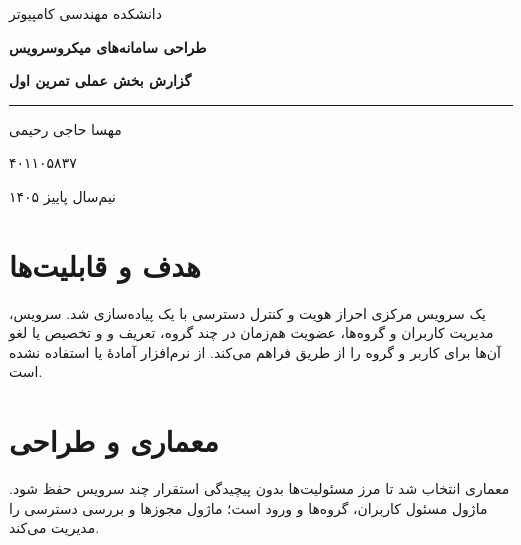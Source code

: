 \documentclass[12pt,a4paper]{article}
\newcommand{\StudentName}{مهسا حاجی رحیمی}
\newcommand{\StudentID}{۴۰۱۱۰۵۸۳۷}
\begin{document}
\begin{titlepage}
\thispagestyle{empty}
\vspace*{2.75cm}
\begin{center}
{\color{slate}\fontsize{16}{26}\selectfont دانشکده مهندسی کامپیوتر\par}
\vspace{1.25cm}
{\color{navy}\bfseries\fontsize{27}{42}\selectfont طراحی سامانه‌های میکروسرویس\par}
\vspace{1.05cm}
{\color{teal}\bfseries\fontsize{21}{32}\selectfont گزارش بخش عملی تمرین اول\par}
\vspace{2.65cm}
{\color{gold}\rule{0.38\textwidth}{0.7pt}\par}
\vspace{0.8cm}
{\color{navy}\fontsize{16}{27}\selectfont\StudentName\par}
\vspace{0.3cm}
{\color{slate}\fontsize{14}{24}\selectfont\StudentID\par}
\end{center}
\vfill
\begin{center}
{\color{slate}\fontsize{13}{22}\selectfont نیم‌سال پاییز ۱۴۰۵\par}
\end{center}
\vspace*{1.1cm}
\end{titlepage}

\section{هدف و قابلیت‌ها}
یک سرویس مرکزی احراز هویت و کنترل دسترسی با یک  پیاده‌سازی شد. سرویس، مدیریت کاربران و گروه‌ها، عضویت هم‌زمان در چند گروه، تعریف  و  و تخصیص یا لغو آن‌ها برای کاربر و گروه را از طریق  فراهم می‌کند. از نرم‌افزار آمادهٔ  یا  استفاده نشده است.

\section{معماری و طراحی}
معماری  انتخاب شد تا مرز مسئولیت‌ها بدون پیچیدگی استقرار چند سرویس حفظ شود. ماژول  مسئول کاربران، گروه‌ها و ورود است؛ ماژول  مجوزها و بررسی دسترسی را مدیریت می‌کند.
\end{document}
